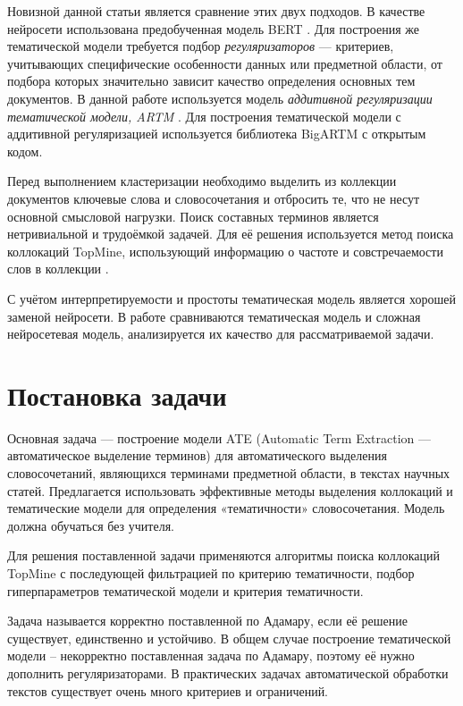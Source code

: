 \documentclass[a4paper, 12pt]{article}
\begin{document}
        Новизной данной статьи является сравнение этих двух подходов. В качестве нейросети использована предобученная модель BERT \citep{wolf-etal-2020-transformers}. Для построения же тематической модели требуется подбор \textit{регуляризаторов} --- критериев, учитывающих специфические особенности данных или предметной области, от подбора которых значительно зависит качество определения основных тем документов. В данной работе используется модель \textit{аддитивной регуляризации тематической модели, ARTM} \citep{vorontsov2020}. Для построения тематической модели с аддитивной регуляризацией используется библиотека BigARTM \citep{Vorontsov2015} с открытым кодом.

        Перед выполнением кластеризации необходимо выделить из коллекции документов ключевые слова и словосочетания и отбросить те, что не несут основной смысловой нагрузки. Поиск составных терминов является нетривиальной и трудоёмкой задачей. Для её решения используется метод поиска коллокаций TopMine, использующий информацию о частоте и совстречаемости слов в коллекции \citep{shatalov2019}.


        С учётом интерпретируемости и простоты тематическая модель является хорошей заменой нейросети. %
        В работе сравниваются тематическая модель и сложная нейросетевая модель, анализируется их качество для рассматриваемой задачи.

\section{Постановка задачи}

        Основная задача --- построение модели ATE (Automatic Term Extraction --- автоматическое выделение терминов) для автоматического выделения словосочетаний, являющихся терминами предметной области, в текстах научных статей. Предлагается использовать эффективные методы выделения коллокаций и тематические модели для определения «тематичности» словосочетания. Модель должна обучаться без учителя.

        Для решения поставленной задачи применяются алгоритмы поиска коллокаций TopMine \citep{ElKishky2014} с последующей фильтрацией по критерию тематичности, подбор гиперпараметров тематической модели и критерия тематичности.

        Задача называется корректно поставленной по Адамару, если её решение существует, единственно и устойчиво. В общем случае построение тематической модели – некорректно поставленная задача по Адамару, поэтому её нужно дополнить регуляризаторами. В практических задачах автоматической обработки текстов существует очень много критериев и ограничений.
\end{document}
